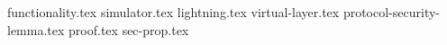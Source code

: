 \documentclass{llncs}
\begin{document}
\pagestyle{plain}
{functionality.tex}
{simulator.tex}
{lightning.tex}
{virtual-layer.tex}
{protocol-security-lemma.tex}
{proof.tex}
{sec-prop.tex}


\end{document}
